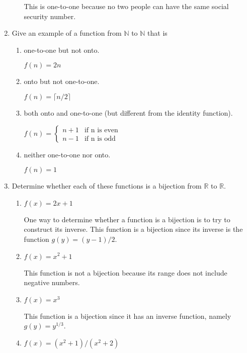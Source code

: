 \documentclass[11pt]{article}
\begin{document}
\begin{enumerate}[label=\textbf{\arabic*.}]
\begin{enumerate}[label=\textbf{\alph*)}]
		This is one-to-one because no two people can have the same social security number.
	\end{enumerate}

	\item Give an example of a function from $\mathbb{N}$ to $\mathbb{N}$ that is
	
	\begin{enumerate}[label=\textbf{\alph*)}]
		\item one-to-one but not onto.
		
		$f(n) = 2n$
		
		\item onto but not one-to-one.
		
		$f(n) = \lceil n / 2 \rceil$
		
		\item both onto and one-to-one (but different from the identity function).
		
		$
		f(n) = 
		\begin{cases}
			n + 1 & \text{if n is even} \\
			n - 1 & \text{if n is odd}
		\end{cases}
		$
		
		\item neither one-to-one nor onto.
		
		$f(n) = 1$
	\end{enumerate}

	\item Determine whether each of these functions is a bijection from $\mathbb{R}$ to $\mathbb{R}$.
	
	\begin{enumerate}[label=\textbf{\alph*)}]
		\item $f(x) = 2x + 1$
		
		One way to determine whether a function is a bijection is to try to construct its inverse. This function is a bijection since its inverse is the function $g(y) = (y - 1) / 2$.
		
		\item $f(x) = x^2 + 1$
		
		This function is not a bijection because its range does not include negative numbers.
		
		\item $f(x) = x^3$
		
		This function is a bijection since it has an inverse function, namely $g(y) = y^{1/3}$.
		
		\item $f(x) = (x^2 + 1) / (x^2 + 2)$
		

\end{enumerate}
\end{enumerate}
\end{document}
